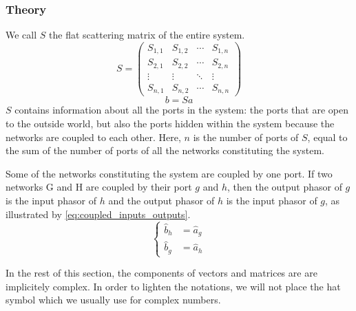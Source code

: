 \subsubsection{Theory}

We call $S$ the flat scattering matrix of the entire system.
\begin{equation*}
    S =
    \begin{pmatrix}
        S_{1, 1} & S_{1, 2} & \cdots & S_{1, n} \\
        S_{2, 1} & S_{2, 2} & \cdots & S_{2, n} \\
        \vdots   & \vdots   & \ddots & \vdots \\
        S_{n, 1} & S_{n, 2} & \cdots & S_{n, n}
    \end{pmatrix}
\end{equation*}
\begin{equation*}
    b = Sa
\end{equation*}
$S$ contains information about all the ports in the system: the ports that are open to the outside world, but also the ports hidden within the system because the networks are coupled to each other.
Here, $n$ is the number of ports of $S$, equal to the sum of the number of ports of all the networks constituting the system.

Some of the networks constituting the system are coupled by one port.
If two networks G and H are coupled by their port $g$ and $h$, then the output phasor of $g$ is the input phasor of $h$ and the output phasor of $h$ is the input phasor of $g$, as illustrated by \cref{eq:coupled_inputs_outputs}.
\begin{equation}
    \left\lbrace
    \begin{aligned}
        \hat{b}_h &= \hat{a}_g \\
        \hat{b}_g &= \hat{a}_h
    \end{aligned}
    \right.
    \label{eq:coupled_inputs_outputs}
\end{equation}

In the rest of this section, the components of vectors and matrices are are implicitely complex.
In order to lighten the notations, we will not place the hat symbol which we usually use for complex numbers.

